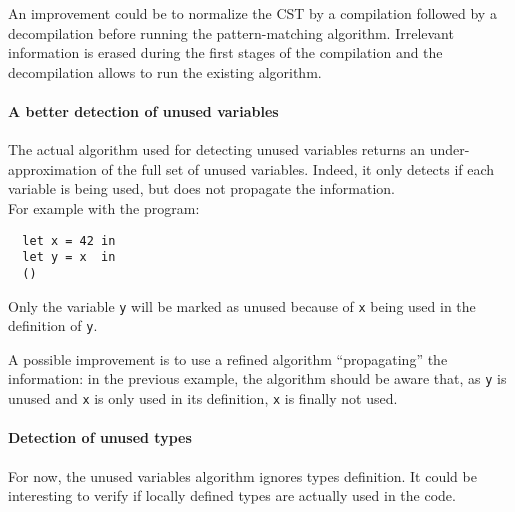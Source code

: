 \documentclass[10pt,a4paper]{article}
\begin{document}
An improvement could be to normalize the CST by a compilation followed by a decompilation before running the pattern-matching algorithm. Irrelevant information is erased during the first stages of the compilation and the decompilation allows to run the existing algorithm.

\paragraph{A better detection of unused variables}

The actual algorithm used for detecting unused variables returns an under-approximation of the full set of unused variables. Indeed, it only detects if each variable is being used, but does not propagate the information.\\
For example with the program:
\begin{verbatim}
  let x = 42 in
  let y = x  in
  ()
\end{verbatim}
Only the variable \verb|y| will be marked as unused because of \verb|x| being used in the definition of \verb|y|.

A possible improvement is to use a refined algorithm ``propagating'' the information: in the previous example, the algorithm should be aware that, as \verb|y| is unused and \verb|x| is only used in its definition, \verb|x| is finally not used.

\paragraph{Detection of unused types}

For now, the unused variables algorithm ignores types definition. It could be interesting to verify if locally defined types are actually used in the code.
\end{document}
